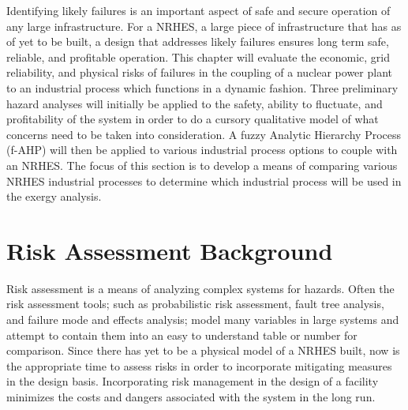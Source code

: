 Identifying likely failures is an important aspect of safe and secure operation of any large infrastructure. For a NRHES, a large piece of infrastructure that has as of yet to be built, a design that addresses likely failures ensures long term safe, reliable, and profitable operation. This chapter will evaluate the economic, grid reliability, and physical risks of failures in the coupling of a nuclear power plant to an industrial process which functions in a dynamic fashion. Three preliminary hazard analyses will initially be applied to the safety, ability to fluctuate, and profitability of the system in order to do a cursory qualitative model of what concerns need to be taken into consideration. A fuzzy Analytic Hierarchy Process (f-AHP) will then be applied to various industrial process options to couple with an NRHES. The focus of this section is to develop a means of comparing various NRHES industrial processes to determine which industrial process will be used in the exergy analysis.
\section{Risk Assessment Background}
Risk assessment is a means of analyzing complex systems for hazards. Often the risk assessment tools; such as probabilistic risk assessment, fault tree analysis, and failure mode and effects analysis; model many variables in large systems and attempt to contain them into an easy to understand table or number for comparison. Since there has yet to be a physical model of a NRHES built, now is the appropriate time to assess risks in order to incorporate mitigating measures in the design basis. Incorporating risk management in the design of a facility minimizes the costs and dangers associated with the system in the long run.

